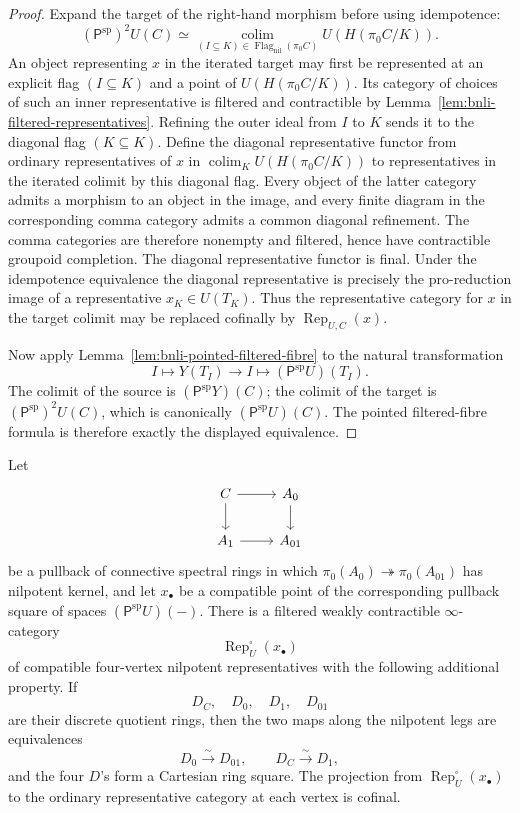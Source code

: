 \begin{proof}
Expand the target of the right-hand morphism before using idempotence:
\[
    (\mathsf P^{\mathrm{sp}})^2U(C)
    \simeq
    \operatorname*{colim}_{(I\subseteq K)\in
      \operatorname{Flag}_{\mathrm{nil}}(\pi_0C)}
    U(H(\pi_0C/K)).
\]
An object representing $x$ in the iterated target may first be represented at
an explicit flag $(I\subseteq K)$ and a point of $U(H(\pi_0C/K))$.  Its
category of choices of such an inner representative is filtered and
contractible by Lemma~\ref{lem:bnli-filtered-representatives}.  Refining the
outer ideal from $I$ to $K$ sends it to the diagonal flag $(K\subseteq K)$.
Define the diagonal representative functor from ordinary representatives of
$x$ in $\operatorname*{colim}_K U(H(\pi_0C/K))$ to representatives in the
iterated colimit by this diagonal flag.  Every object of the latter category
admits a morphism to an object in the image, and every finite diagram in the
corresponding comma category admits a common diagonal refinement.  The comma
categories are therefore nonempty and filtered, hence have contractible
groupoid completion.  The diagonal representative functor is final.  Under the idempotence equivalence the diagonal
representative is precisely the pro-reduction image of a representative
$x_K\in U(T_K)$.  Thus the representative category for $x$ in the target
colimit may be replaced cofinally by $\operatorname{Rep}_{U,C}(x)$.

Now apply Lemma~\ref{lem:bnli-pointed-filtered-fibre} to the natural
transformation
\[
    I\longmapsto Y(T_I)
    \longrightarrow
    I\longmapsto(\mathsf P^{\mathrm{sp}}U)(T_I).
\]
The colimit of the source is $(\mathsf P^{\mathrm{sp}}Y)(C)$; the colimit of
the target is $(\mathsf P^{\mathrm{sp}})^2U(C)$, which is canonically
$(\mathsf P^{\mathrm{sp}}U)(C)$.  The pointed filtered-fibre formula is
therefore exactly the displayed equivalence.
\end{proof}

\begin{lemma}
\label{lem:bnli-simultaneous-square-representatives}
Let
\[
\begin{tikzcd}
C \arrow[r] \arrow[d] & A_0 \arrow[d]\\
A_1 \arrow[r] & A_{01}
\end{tikzcd}
\]
be a pullback of connective spectral rings in which
$\pi_0(A_0)\twoheadrightarrow\pi_0(A_{01})$ has nilpotent kernel, and let
$x_\bullet$ be a compatible point of the corresponding pullback square of
spaces $(\mathsf P^{\mathrm{sp}}U)(-)$.  There is a filtered weakly
contractible $\infty$-category
\[
    \operatorname{Rep}^{\square}_U(x_\bullet)
\]
of compatible four-vertex nilpotent representatives with the following
additional property.  If
\[
    D_C,
    \quad D_0,
    \quad D_1,
    \quad D_{01}
\]
are their discrete quotient rings, then the two maps along the nilpotent legs
are equivalences
\[
\boxed{
    D_0\xrightarrow{\sim}D_{01},
    \qquad
    D_C\xrightarrow{\sim}D_1,}
\]
and the four $D$'s form a Cartesian ring square.  The projection from
$\operatorname{Rep}^{\square}_U(x_\bullet)$ to the ordinary representative
category at each vertex is cofinal.
\end{lemma}

